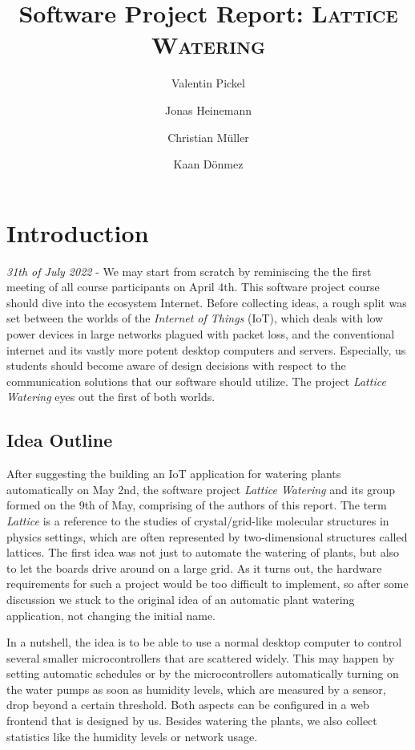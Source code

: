 \documentclass[acmtog, language=english, nonacm]{acmart}
\title{Software Project Report: \textsc{Lattice Watering}}
\author{Valentin Pickel}
\author{Jonas Heinemann}
\author{Christian Müller}
\author{Kaan Dönmez}
\affiliation{%
    \department[0]{Institute for Computer Science}%
    \institution{Freie Universität Berlin}%
    \city{Berlin}%
    \country{Germany}}
\begin{document}
    \maketitle

    \section{Introduction}

    \emph{31th of July 2022} - We may start from scratch by reminiscing the the first meeting of all course participants on April 4th. This software project course should dive into the ecosystem Internet. Before collecting ideas, a rough split was set between the worlds of the \emph{Internet of Things} (IoT), which deals with low power devices in large networks plagued with packet loss, and the conventional internet and its vastly more potent desktop computers and servers. Especially, us students should become aware of design decisions with respect to the communication solutions that our software should utilize. The project \emph{Lattice Watering} eyes out the first of both worlds.

    \subsection{Idea Outline}

    After suggesting the building an IoT application for watering plants automatically on May 2nd, the software project \emph{Lattice Watering} and its group formed on the 9th of May, comprising of the authors of this report. The term \emph{Lattice} is a reference to the studies of crystal/grid-like molecular structures in physics settings, which are often represented by two-dimensional structures called lattices. The first idea was not just to automate the watering of plants, but also to let the boards drive around on a large grid. As it turns out, the hardware requirements for such a project would be too difficult to implement, so after some discussion we stuck to the original idea of an automatic plant watering application, not changing the initial name.

    In a nutshell, the idea is to be able to use a normal desktop computer to control several smaller microcontrollers that are scattered widely. This may happen by setting automatic schedules or by the microcontrollers automatically turning on the water pumps as soon as humidity levels, which are measured by a sensor, drop beyond a certain threshold. Both aspects can be configured in a web frontend that is designed by us. Besides watering the plants, we also collect statistics like the humidity levels or network usage.
\end{document}
